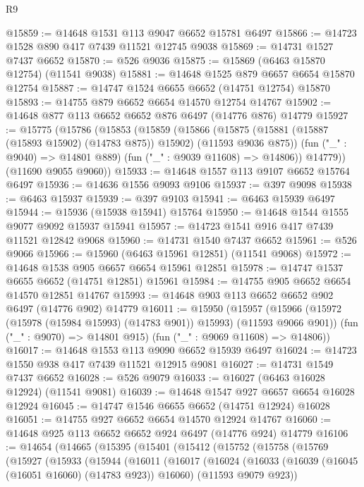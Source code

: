 \begin{lexlean}{R9}
\begin{coremodule}
@15859 := @14648 @1531 @113 @9047 @6652 @15781 @6497
@15866 := @14723 @1528 @890 @417 @7439 @11521 @12745 @9038
@15869 := @14731 @1527 @7437 @6652
@15870 := @526 @9036
@15875 := @15869 (@6463 @15870 @12754) (@11541 @9038)
@15881 := @14648 @1525 @879 @6657 @6654 @15870 @12754
@15887 := @14747 @1524 @6655 @6652 (@14751 @12754) @15870
@15893 := @14755 @879 @6652 @6654 @14570 @12754 @14767
@15902 := @14648 @877 @113 @6652 @6652 @876 @6497 (@14776 @876) @14779
@15927 := @15775
    (@15786
      (@15853
        (@15859
          (@15866
            (@15875 (@15881 (@15887 (@15893 @15902) (@14783 @875)) @15902) (@11593 @9036 @875))
            (fun ("_" : @9040) => @14801 @889)
            (fun ("_" : @9039 @11608) => @14806))
          @14779))
      (@11690 @9055 @9060))
@15933 := @14648 @1557 @113 @9107 @6652 @15764 @6497
@15936 := @14636 @1556 @9093 @9106
@15937 := @397 @9098
@15938 := @6463 @15937
@15939 := @397 @9103
@15941 := @6463 @15939 @6497
@15944 := @15936 (@15938 @15941) @15764
@15950 := @14648 @1544 @1555 @9077 @9092 @15937 @15941
@15957 := @14723 @1541 @916 @417 @7439 @11521 @12842 @9068
@15960 := @14731 @1540 @7437 @6652
@15961 := @526 @9066
@15966 := @15960 (@6463 @15961 @12851) (@11541 @9068)
@15972 := @14648 @1538 @905 @6657 @6654 @15961 @12851
@15978 := @14747 @1537 @6655 @6652 (@14751 @12851) @15961
@15984 := @14755 @905 @6652 @6654 @14570 @12851 @14767
@15993 := @14648 @903 @113 @6652 @6652 @902 @6497 (@14776 @902) @14779
@16011 := @15950
    (@15957
      (@15966 (@15972 (@15978 (@15984 @15993) (@14783 @901)) @15993) (@11593 @9066 @901))
      (fun ("_" : @9070) => @14801 @915)
      (fun ("_" : @9069 @11608) => @14806))
@16017 := @14648 @1553 @113 @9090 @6652 @15939 @6497
@16024 := @14723 @1550 @938 @417 @7439 @11521 @12915 @9081
@16027 := @14731 @1549 @7437 @6652
@16028 := @526 @9079
@16033 := @16027 (@6463 @16028 @12924) (@11541 @9081)
@16039 := @14648 @1547 @927 @6657 @6654 @16028 @12924
@16045 := @14747 @1546 @6655 @6652 (@14751 @12924) @16028
@16051 := @14755 @927 @6652 @6654 @14570 @12924 @14767
@16060 := @14648 @925 @113 @6652 @6652 @924 @6497 (@14776 @924) @14779
@16106 := @14654
    (@14665
      (@15395
        (@15401
          (@15412
            (@15752
              (@15758
                (@15769
                  (@15927
                    (@15933
                      (@15944
                        (@16011
                          (@16017
                            (@16024
                              (@16033
                                (@16039 (@16045 (@16051 @16060) (@14783 @923)) @16060)
                                (@11593 @9079 @923))

\end{coremodule}
\end{lexlean}
